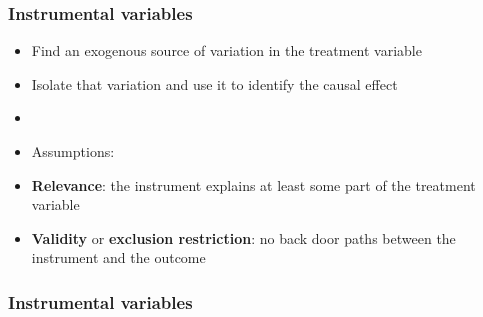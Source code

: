 \documentclass[aspectratio=43]{beamer}
\begin{document}
\begin{frame}
\frametitle{Instrumental variables}
\centering

\begin{itemize}
  \item<1-> Find an exogenous source of variation in the treatment variable
  \item<1-> Isolate that variation and use it to identify the causal effect
  \item[]
  \item<2-> Assumptions:
  \item<2-> \textbf{Relevance}: the instrument explains at least some part of the treatment variable
  \item<2-> \textbf{Validity} or \textbf{exclusion restriction}: no back door paths between the instrument and the outcome
\end{itemize}

\end{frame}

\begin{frame}
\frametitle{Instrumental variables}
\centering


\end{frame}
\end{document}
